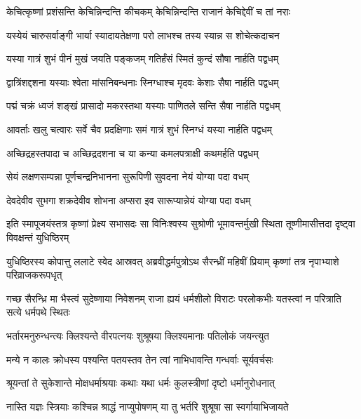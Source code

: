 \twolineshloka
{केचित्कृष्णां प्रशंसन्ति केचिन्निन्दन्ति कीचकम्}
{केचिन्निन्दन्ति राजानं केचिद्देवीं च तां नराः}




\twolineshloka
{यस्येयं चारुसर्वाङ्गी भार्या स्यादायतेक्षणा}
{परो लाभश्च तस्य स्यान्न स शोचेत्कदाचन}


\twolineshloka
{यस्या गात्रं शुभं पीनं मुखं जयति पङ्कजम्}
{गतिर्हंसं स्मितं कुन्दं सौषा नार्हति पद्वधम्}


\twolineshloka
{द्वात्रिंशद्दशना यस्याः श्वेता मांसनिबन्धनाः}
{स्निग्धाश्च मृदवः केशाः सैषा नार्हति पद्वधम्}


\twolineshloka
{पद्मं चक्रं ध्वजं शङ्खं प्रासादो मकरस्तथा}
{यस्याः पाणितले सन्ति सैषा नार्हति पद्वधम्}


\twolineshloka
{आवर्ताः खलु चत्वारः सर्वे चैव प्रदक्षिणाः}
{समं गात्रं शुभं स्निग्धं यस्या नार्हति पद्वधम्}


\twolineshloka
{अच्छिद्रहस्तपादा च अच्छिद्रदशना च या}
{कन्या कमलपत्राक्षी कथमर्हति पद्वधम्}


\twolineshloka
{सेयं लक्षणसम्पन्ना पूर्णचन्द्रनिभानना}
{सुरूपिणी सुवदना नेयं योग्या पदा वधम्}


\twolineshloka
{देवदेवीव सुभगा शक्रदेवीव शोभना}
{अप्सरा इव सारूप्यान्नेयं योग्या पदा वधम्}


\onelineshloka
{इति स्मापूजयंस्तत्र कृष्णां प्रेक्ष्य सभासदः}
\twolineshloka
{सा विनिःश्वस्य सुश्रोणी भूमावन्तर्मुखी स्थिता}
{तूष्णीमासीत्तदा दृष्ट्वा विवक्षन्तं युधिष्ठिरम्}


\threelineshloka
{युधिष्ठिरस्य कोपात्तु ललाटे स्वेद आस्रवत्}
{अब्रवीद्धर्मपुत्रोऽथ सैरन्ध्रीं महिषीं प्रियाम्}
{कृष्णां तत्र नृपाभ्याशे परिव्राजकरूपधृत्}


\threelineshloka
{गच्छ सैरन्ध्रि मा भैस्त्वं सुदेष्णाया निवेशनम्}
{राजा ह्ययं धर्मशीलो विराटः परलोकभीः}
{यतस्त्वां न परित्राति सत्ये धर्मपथे स्थितः}


\twolineshloka
{भर्तारमनुरुन्धन्त्यः क्लिश्यन्ते वीरपत्नयः}
{शुश्रूषया क्लिश्यमानाः पतिलोकं जयन्त्युत}


\twolineshloka
{मन्ये न कालः क्रोधस्य पश्यन्ति पतयस्तव}
{तेन त्वां नाभिधावन्ति गन्धर्वाः सूर्यवर्चसः}


\twolineshloka
{श्रूयन्तां ते सुकेशान्ते मोक्षधर्माश्रयाः कथाः}
{यथा धर्मः कुलस्त्रीणां दृष्टो धर्मानुरोधनात्}


\twolineshloka
{नास्ति यज्ञः स्त्रियाः कश्चिन्न श्राद्धं नाप्युपोषणम्}
{या तु भर्तरि शुश्रूषा सा स्वर्गायाभिजायते}



